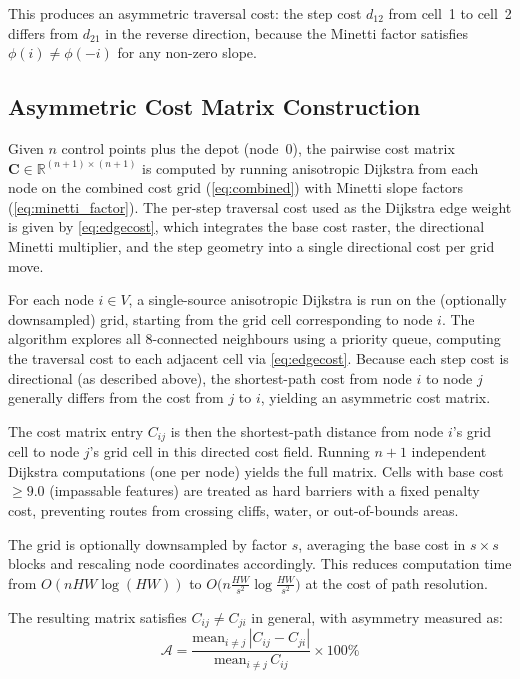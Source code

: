 \documentclass[preprint,11pt]{elsarticle}
\begin{document}
This produces an asymmetric traversal cost: the step cost $d_{12}$ from cell~1 to cell~2 differs from $d_{21}$ in the reverse direction, because the Minetti factor satisfies $\phi(i) \neq \phi(-i)$ for any non-zero slope.

\subsection{Asymmetric Cost Matrix Construction}
\label{sec:costmatrix}

Given $n$ control points plus the depot (node~0), the pairwise cost matrix $\mathbf{C} \in \mathbb{R}^{(n+1) \times (n+1)}$ is computed by running anisotropic Dijkstra from each node on the combined cost grid (\cref{eq:combined}) with Minetti slope factors (\cref{eq:minetti_factor}).
The per-step traversal cost used as the Dijkstra edge weight is given by \cref{eq:edgecost}, which integrates the base cost raster, the directional Minetti multiplier, and the step geometry into a single directional cost per grid move.

For each node $i \in V$, a single-source anisotropic Dijkstra is run on the (optionally downsampled) grid, starting from the grid cell corresponding to node $i$.
The algorithm explores all 8-connected neighbours using a priority queue, computing the traversal cost to each adjacent cell via \cref{eq:edgecost}.
Because each step cost is directional (as described above), the shortest-path cost from node $i$ to node $j$ generally differs from the cost from $j$ to $i$, yielding an asymmetric cost matrix.

The cost matrix entry $C_{ij}$ is then the shortest-path distance from node $i$'s grid cell to node $j$'s grid cell in this directed cost field.
Running $n+1$ independent Dijkstra computations (one per node) yields the full matrix.
Cells with base cost $\geq 9.0$ (impassable features) are treated as hard barriers with a fixed penalty cost, preventing routes from crossing cliffs, water, or out-of-bounds areas.

The grid is optionally downsampled by factor $s$, averaging the base cost in $s \times s$ blocks and rescaling node coordinates accordingly.
This reduces computation time from $O(nHW \log(HW))$ to $O\bigl(n \frac{HW}{s^2} \log \frac{HW}{s^2}\bigr)$ at the cost of path resolution.

The resulting matrix satisfies $C_{ij} \neq C_{ji}$ in general, with asymmetry measured as:
\begin{equation}
  \mathcal{A} = \frac{\text{mean}_{i \neq j}\, |C_{ij} - C_{ji}|}{\text{mean}_{i \neq j}\, C_{ij}} \times 100\%
  \label{eq:asymmetry}
\end{equation}
\end{document}

